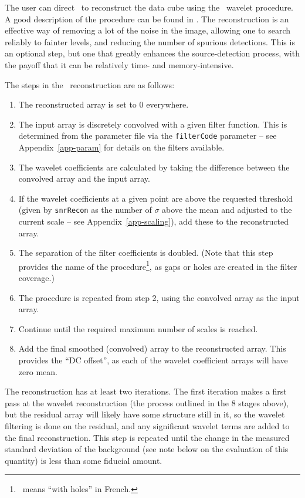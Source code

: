 \label{sec-recon}

The user can direct \duchamp\ to reconstruct the data cube using the
\atrous\ wavelet procedure. A good description of the procedure can be
found in \citet{starck02:book}. The reconstruction is an effective way
of removing a lot of the noise in the image, allowing one to search
reliably to fainter levels, and reducing the number of spurious
detections. This is an optional step, but one that greatly enhances
the source-detection process, with the payoff that it can be
relatively time- and memory-intensive.


The steps in the \atrous\ reconstruction are as follows:
\begin{enumerate}
\item The reconstructed array is set to 0 everywhere.
\item The input array is discretely convolved with a given filter
  function. This is determined from the parameter file via the
  \texttt{filterCode} parameter -- see Appendix~\ref{app-param} for
  details on the filters available.
\item The wavelet coefficients are calculated by taking the difference
  between the convolved array and the input array.
\item If the wavelet coefficients at a given point are above the
  requested threshold (given by \texttt{snrRecon} as the number of
  $\sigma$ above the mean and adjusted to the current scale -- see
  Appendix~\ref{app-scaling}), add these to the reconstructed array.
\item The separation of the filter coefficients is doubled. (Note that
  this step provides the name of the procedure\footnote{\atrous\ means
  ``with holes'' in French.}, as gaps or holes are created in the
  filter coverage.)
\item The procedure is repeated from step 2, using the convolved array
  as the input array.
\item Continue until the required maximum number of scales is reached.
\item Add the final smoothed (\ie convolved) array to the
  reconstructed array. This provides the ``DC offset'', as each of the
  wavelet coefficient arrays will have zero mean.
\end{enumerate}

The reconstruction has at least two iterations. The first iteration
makes a first pass at the wavelet reconstruction (the process outlined
in the 8 stages above), but the residual array will likely have some
structure still in it, so the wavelet filtering is done on the
residual, and any significant wavelet terms are added to the final
reconstruction. This step is repeated until the change in the measured
standard deviation of the background (see note below on the evaluation
of this quantity) is less than some fiducial amount.

